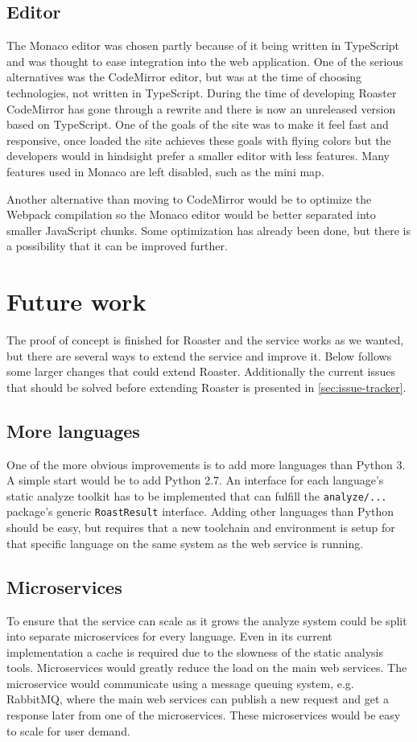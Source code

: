 \documentclass[12pt,a4paper]{report}
\begin{document}
\section{Editor}
The Monaco editor was chosen partly because of it being written in TypeScript and was thought to ease integration into the web application. One of the serious alternatives was the CodeMirror editor\cite{codemirror}, but was at the time of choosing technologies, not written in TypeScript. During the time of developing Roaster CodeMirror has gone through a rewrite and there is now an unreleased version based on TypeScript\cite{codemirror-ts}. One of the goals of the site was to make it feel fast and responsive, once loaded the site achieves these goals with flying colors but the developers would in hindsight prefer a smaller editor with less features. Many features used in Monaco are left disabled, such as the mini map.

Another alternative than moving to CodeMirror would be to optimize the Webpack compilation so the Monaco editor would be better separated into smaller JavaScript chunks. Some optimization has already been done, but there is a possibility that it can be improved further.

\chapter{Future work}
\label{sec:future-work}
The proof of concept is finished for Roaster and the service works as we wanted, but there are several ways to extend the service and improve it. Below follows some larger changes that could extend Roaster. Additionally the current issues that should be solved before extending Roaster is presented in \autoref{sec:issue-tracker}.

\section{More languages}
One of the more obvious improvements is to add more languages than Python 3. A simple start would be to add Python 2.7. An interface for each language's static analyze toolkit has to be implemented that can fulfill the \texttt{analyze/...} package's generic \texttt{RoastResult} interface. Adding other languages than Python should be easy, but requires that a new toolchain and environment is setup for that specific language on the same system as the web service is running.

\section{Microservices}
To ensure that the service can scale as it grows the analyze system could be split into separate microservices for every language. Even in its current implementation a cache is required due to the slowness of the static analysis tools. Microservices would greatly reduce the load on the main web services. The microservice would communicate using a message queuing system, e.g. RabbitMQ, where the main web services can publish a new request and get a response later from one of the microservices. These microservices would be easy to scale for user demand.
\end{document}
